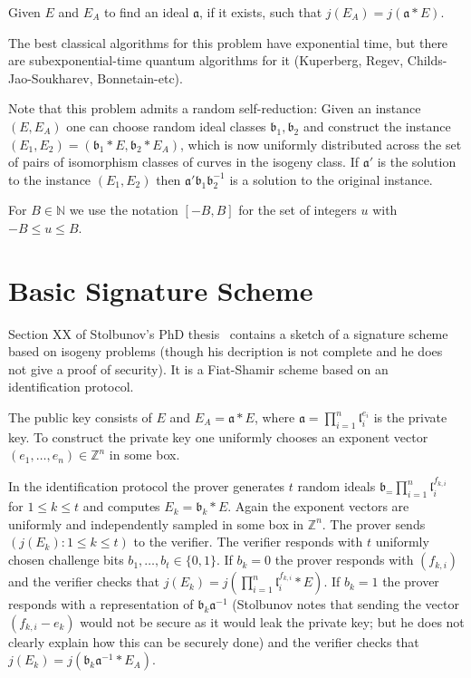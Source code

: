 \documentclass{llncs}
\newcommand{\N}{\mathbb{N}}
\newcommand{\Z}{\mathbb{Z}}
\renewcommand{\a}{\mathfrak{a}}
\renewcommand{\b}{\mathfrak{b}}
\renewcommand{\l}{\mathfrak{l}}
\begin{document}
\begin{definition}\label{defn:ass1}
Given $E$ and $E_A$ to find an ideal $\a$, if it exists, such that $j( E_A ) = j( \a * E )$.
\end{definition}

The best classical algorithms for this problem have exponential time, but there are subexponential-time quantum algorithms for it (Kuperberg, Regev, Childs-Jao-Soukharev, Bonnetain-etc).

Note that this problem admits a random self-reduction: Given an instance $(E, E_A)$ one can choose random ideal classes $\b_1, \b_2$ and construct the instance $(E_1, E_2) = (\b_1 * E, \b_2 * E_A )$, which is now uniformly distributed across the set of pairs of isomorphism classes of curves in the isogeny class.
If $\a'$ is the solution to the instance $(E_1, E_2)$ then $\a'\b_1 \b_2^{-1}$ is a solution to the original instance.


For $B \in \N$ we use the notation $[-B,B]$ for the set of integers $u$ with $-B \le u \le B$.


\section{Basic Signature Scheme}

Section XX of Stolbunov's PhD thesis~\cite{Sto12} contains a sketch of a signature scheme based on isogeny problems (though his decription is not complete and he does not give a proof of security).
It is a Fiat-Shamir scheme based on an identification protocol.

The public key consists of $E$ and $E_A = \a * E$, where $\a = \prod_{i=1}^n \l_i^{e_i}$ is the private key.
To construct the private key one uniformly chooses an exponent vector $(e_1, \dots, e_n) \in \Z^n$ in some box.

In the identification protocol the prover generates $t$ random ideals $\b_ = \prod_{i=1}^n \l_i^{f_{k,i}}$ for $1 \le k \le t$ and computes $E_k = \b_k * E$.
Again the exponent vectors are uniformly and independently sampled in some box in $\Z^n$.
The prover sends $(j( E_k ) : 1 \le k \le t )$ to the verifier.
The verifier responds with $t$ uniformly chosen challenge bits $b_1, \dots, b_t \in \{0,1\}$.
If $b_k = 0$ the prover responds with $( f_{k,i} )$ and the verifier checks that $j(E_k) = j( \prod_{i=1}^n \l_i^{f_{k,i}} * E )$.
If $b_k = 1$ the prover responds with a representation of $\b_k \a^{-1}$ (Stolbunov notes that sending the vector $(f_{k,i} - e_k )$ would not be secure as it would leak the private key; but he does not clearly explain how this can be securely done) and the verifier checks that $j(E_k) = j( \b_k \a^{-1} * E_A )$.
\end{document}
